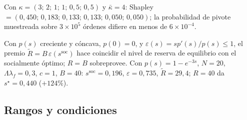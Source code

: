 Con $\kappa=(3;\,2;\,1;\,1;\,0{,}5;\,0{,}5)$ y $\bar\kappa=4$: Shapley
$=(0{,}450;\,0{,}183;\,0{,}133;\,0{,}133;\,0{,}050;\,0{,}050)$; la probabilidad de
pivote muestreada sobre $3\times10^{5}$ órdenes difiere en menos de
$6\times10^{-4}$.

\begin{teorema}
\label{th:N-prima}
Con $p(s)$ creciente y cóncava, $p(0)=0$, y $\varepsilon(s)=sp'(s)/p(s)\le1$, el
premio $\widetilde R=B\,\varepsilon(s^{\mathrm{soc}})$ hace coincidir el nivel de
reserva de equilibrio con el socialmente óptimo; $R=B$ sobreprovee. Con
$p(s)=1-e^{-3s}$, $N=20$, $\Lambda\lambda_f=0{,}3$, $c=1$, $B=40$:
$s^{\mathrm{soc}}=0{,}196$, $\varepsilon=0{,}735$, $\widetilde R=29{,}4$; $R=40$
da $s^\star=0{,}440$ ($+124\%$).
\end{teorema}

\subsection{Rangos y condiciones}

